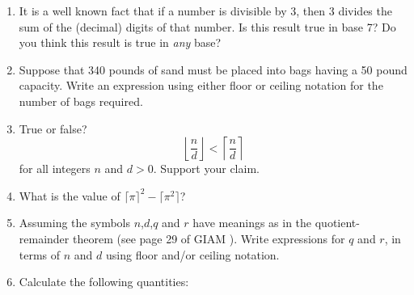 \documentclass[10pt,]{book}
\theoremstyle{plain}
\theoremstyle{definition}
\theoremstyle{definition}
\numberwithin{equation}{section}
\newcommand{\hint}[1]{ }
\newcommand{\lt}{ < }
\begin{document}
\begin{enumerate}[label=(\alph*)]
\item\hypertarget{li-68}{}
          It is a well known fact that if a number is divisible by 3, then 3
            divides the sum of the (decimal) digits of that number.  Is this
            result true in base 7?  Do you think this result is true in \emph{any} base? 
 
 
 
          \hint{Might this effect have something to do with 10 being just one bigger than 9 (a multiple of 3)?}
\item\hypertarget{li-69}{}
          Suppose that 340 pounds of sand must be placed into bags having
            a 50 pound capacity.  Write an expression using either floor or
            ceiling notation for the number of bags required.



          \hint{Seven 50 pound bags would hold 350 pounds of sand. They'd also be able to handle 340 pounds!}
\item\hypertarget{li-70}{}
          True or false?
          \begin{equation*}
            \left\lfloor \frac{n}{d}\right\rfloor \lt  \left\lceil \frac{n}{d}\right\rceil
          \end{equation*}
          for all integers \(n\) and \(d>0\). Support your claim.



          \hint{You have to try a bunch of examples.  You should try to make sure the examples
          you try cover all the possibilities.  The pairs that provide counterexamples (i.e. show the statement is false in general) are relatively sparse, so be systematic.}
\item\hypertarget{li-71}{}
          What is the value of \(\lceil\pi\rceil^{2}-\lceil\pi^{2}\rceil\)?



          \hint{ \(\pi^2 = 9.8696\) }
\item\hypertarget{li-72}{}
          Assuming the symbols \(n\),\(d\),\(q\) and \(r\) have meanings as in the
            quotient-remainder theorem (see page 29 of GIAM ).  Write
            expressions for \(q\) and \(r\), in terms of \(n\) and \(d\) using floor
            and/or ceiling notation.



          \hint{I just can't bring myself to spoil this one for you, you really need to work this out on your own. }
\item\hypertarget{li-73}{}
      Calculate the following quantities:


\end{enumerate}
\end{document}
